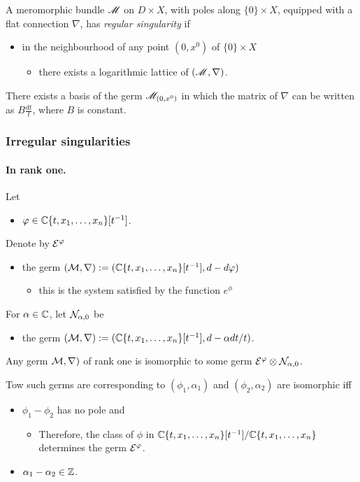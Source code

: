 \begin{defn}[II.2.24]
  A meromorphic bundle $\mathscr{M}$ on $D\times X$, with poles along $\{0\}\times X$,
  equipped with a flat connection $\nabla$, has \emph{regular singularity} if
  \begin{itemize}
    \item in the neighbourhood of any point $(0,x^0)$ of $\{0\}\times X$
      \begin{itemize}
        \item there exists a logarithmic lattice of $(\mathscr{M},\nabla)$.
      \end{itemize}
  \end{itemize}
\end{defn}
\begin{thm}
  There exists a basis of the germ $\mathscr{M}_{(0,x^0)}$ in which the matrix of
  $\nabla$ can be written as $B\frac{dt}{t}$, where $B$ is constant.
\end{thm}
\subsubsection{Irregular singularities}
\paragraph{In rank one.}
Let
\begin{itemize}
  \item $\varphi\in\mathbb{C}\{t,x_1,\dots,x_n\}[t^{-1}]$.
\end{itemize}
Denote by $\mathcal{E}^{\varphi}$
\begin{itemize}
  \item the germ $(\mathcal{M},\nabla):=(\mathbb{C}\{t,x_1,\dots,x_n\}[t^{-1}],d-d\varphi)$
    \begin{itemize}
      \item this is the system satisfied by the function $e^\phi$
    \end{itemize}
\end{itemize}
For $\alpha\in\mathbb{C}$, let $\mathcal{N}_{\alpha,0}$ be
\begin{itemize}
  \item the germ
    $(\mathcal{M},\nabla):=(\mathbb{C}\{t,x_1,\dots,x_n\}[t^{-1}],d-\alpha dt/t)$.
\end{itemize}
\begin{prop}
  Any germ $\mathcal{M},\nabla)$ of rank one is isomorphic to some germ
  $\mathcal{E}^{\varphi}\otimes\mathcal{N}_{\alpha,0}$.

  Tow such germs are corresponding to $(\phi_1,\alpha_1)$ and
  $(\phi_2,\alpha_2)$ are isomorphic iff
  \begin{itemize}
    \item $\phi_1-\phi_2$ has no pole and
      \begin{itemize}
        \item Therefore, the class of $\phi$ in
          $\mathbb{C}\{t,x_1,\dots,x_n\}[t^{-1}]/\mathbb{C}\{t,x_1,\dots,x_n\}$ determines the
          germ $\mathcal{E}^\varphi$.
      \end{itemize}
    \item $\alpha_1-\alpha_2\in\mathbb{Z}$.
  \end{itemize}
\end{prop}
